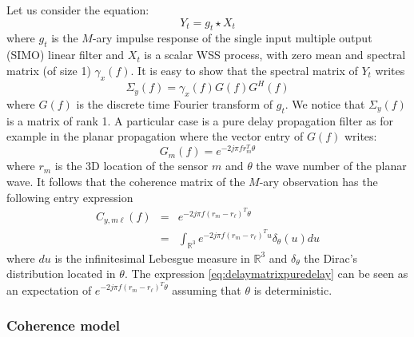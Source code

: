 
Let us consider the equation:
$$
 Y_{t}=g_{t} \star X_{t}
$$
where $g_{t}$ is the $M$-ary impulse response of the single input multiple output (SIMO) linear filter and $X_{t}$ is a scalar WSS process, with zero mean and spectral matrix (of size 1) $\gamma_{x}(f)$. It is easy to show that the spectral matrix of $Y_{t}$ writes
$$
 \Sigma_{y}(f)=\gamma_{x}(f)G(f)G^{H}(f)
$$
where $G(f)$ is the discrete time Fourier transform of $g_{t}$.
We notice that $\Sigma_{y}(f)$ is a matrix of rank 1. A particular case is a pure delay propagation filter as for example in the planar propagation where the vector entry of $G(f)$ writes:
$$
 G_{m}(f)=e^{-2j\pi f r_{m}^{T}\theta}
$$
where $r_{m}$ is the 3D location of the sensor $m$ and $\theta$ the wave number of the planar wave. It follows that the coherence matrix of the $M$-ary observation has the following entry expression
\begin{eqnarray}
 \label{eq:delaymatrixpuredelay}
 C_{y,m\ell}(f)&=&e^{-2j\pi f (r_{m}-r_{\ell})^{T}\theta}
 \\ \nonumber
 &=&\int_{\mathds{R}^{3}} e^{-2j\pi f (r_{m}-r_{\ell})^{T}u}\delta_{\theta}(u)du
\end{eqnarray}
where $du$ is the infinitesimal Lebesgue measure in $\mathds{R}^{3}$ and $\delta_{\theta}$ the Dirac's distribution located in $\theta$. The expression \eqref{eq:delaymatrixpuredelay} can be seen as an expectation of $e^{-2j\pi f (r_{m}-r_{\ell})^{T}\theta}$ assuming that $\theta$ is deterministic.

\subsubsection{Coherence model}


